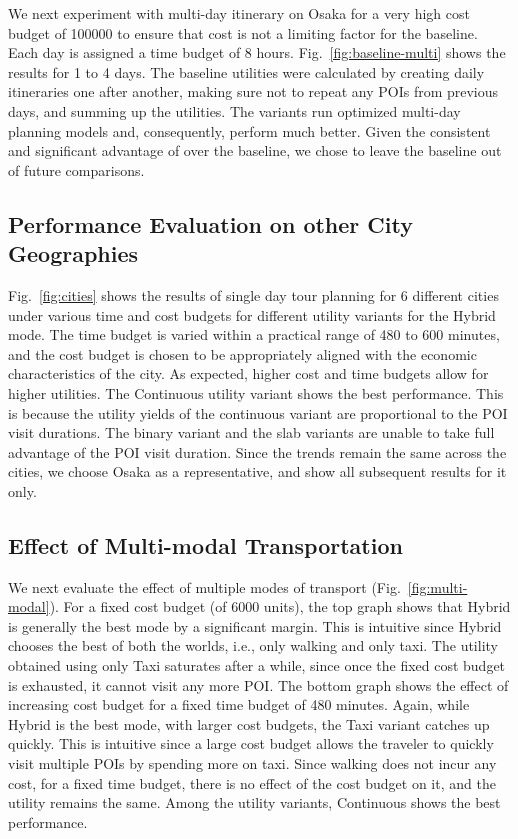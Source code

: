 We next experiment with multi-day itinerary on Osaka for a very high cost budget of 100000 to ensure that cost is not a limiting factor for the baseline.
Each day is assigned a time budget of 8 hours.
Fig.~\ref{fig:baseline-multi} shows the results for 1 to 4 days.
The baseline utilities were calculated by creating daily itineraries one after another, making sure not to repeat any POIs from previous days, and summing up the utilities.
The \trip variants run optimized multi-day planning models and, consequently, perform much better. Given the consistent and significant advantage of \trip over the baseline, we chose to leave the baseline out of future comparisons.

\subsection{Performance Evaluation on other City Geographies}
\label{sec:exp city geographies}

Fig.~\ref{fig:cities} shows the results of single day tour planning for 6 different cities under various time and cost budgets for different utility variants for the Hybrid mode.
The time budget is varied within a practical range of 480 to 600 minutes, and the cost budget is chosen to be appropriately aligned with the economic characteristics of the city.
As expected, higher cost and time budgets allow for higher utilities.
The Continuous utility variant shows the best performance. This is because the utility yields of the continuous variant are proportional to the POI visit durations. The binary variant and the slab variants are unable to take full advantage of the POI visit duration.
Since the trends remain the same across the cities, we choose Osaka as a representative, and show all subsequent results for it only.

\subsection{Effect of Multi-modal Transportation}
\label{sec:exp multimodal}

We next evaluate the effect of multiple modes of transport (Fig.~\ref{fig:multi-modal}).
For a fixed cost budget (of 6000 units), the top graph shows that Hybrid is generally the best mode by a significant margin. This is intuitive since Hybrid chooses the best of both the worlds, i.e., only walking and only taxi.
The utility obtained using only Taxi saturates after a while, since once the fixed cost budget is exhausted, it cannot visit any more POI.
The bottom graph shows the effect of increasing cost budget for a fixed time budget of 480 minutes.
Again, while Hybrid is the best mode, with larger cost budgets, the Taxi variant catches up quickly.
This is intuitive since a large cost budget allows the traveler to quickly visit multiple POIs by spending more on taxi.
Since walking does not incur any cost, for a fixed time budget, there is no effect of the cost budget on it, and the utility remains the same.
Among the utility variants, Continuous shows the best performance.

